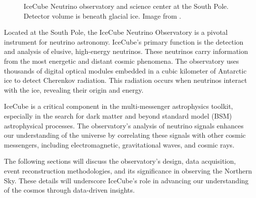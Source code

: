 \begin{figure}[h!]
    \caption{IceCube Neutrino observatory and science center at the South Pole. Detector volume is beneath glacial ice. Image from \cite{IceCube_SPGallery}.}
    \label{fig:IC3_atPole}
\end{figure}

Located at the South Pole, the IceCube Neutrino Observatory is a pivotal instrument for neutrino astronomy.
IceCube's primary function is the detection and analysis of elusive, high-energy neutrinos.
These neutrinos carry information from the most energetic and distant cosmic phenomena.
The observatory uses thousands of digital optical modules embedded in a cubic kilometer of Antarctic ice to detect Cherenkov radiation.
This radiation occurs when neutrinos interact with the ice, revealing their origin and energy.

IceCube is a critical component in the multi-messenger astrophysics toolkit, especially in the search for dark matter and beyond standard model (BSM) astrophysical processes.
The observatory's analysis of neutrino signals enhances our understanding of the universe by correlating these signals with other cosmic messengers, including electromagnetic, gravitational waves, and cosmic rays.

The following sections will discuss the observatory's design, data acquisition, event reconstruction methodologies, and its significance in observing the Northern Sky.
These details will underscore IceCube's role in advancing our understanding of the cosmos through data-driven insights.

